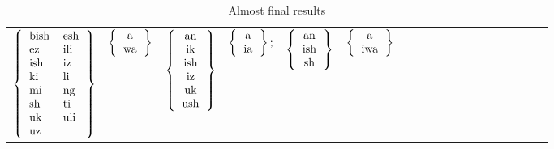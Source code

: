 \documentclass[output=paper,colorlinks,citecolor=brown,
]{langscibook}
\begin{document}
   
\begin{table}
\begin{tabular}{lllllllllllllllllll} 
$ \left\{ \begin{tabular}{ll} bish &  esh     \\ ez  &  ili \\ ish  & iz \\ki  & li\\mi & ng\\sh  &  ti\\ uk  &  uli \\ uz \end{tabular} \right\} $& $\left\{ \begin{tabular}{c}  a \\ wa \end{tabular} \right\}  $  &
$ \left\{ \begin{tabular}{c}  an     \\ ik \\ ish \\ iz \\ uk \\ush  \end{tabular} \right\} $&$ \left\{ \begin{tabular}{c}  a \\ ia \end{tabular} \right\}   ;$ &
$ \left\{ \begin{tabular}{c}  an     \\ ish \\ sh    \end{tabular} \right\} $& $\left\{ \begin{tabular}{c}  a \\ iwa \end{tabular} \right\} $   \\
\end{tabular}
\caption{Almost final results}
\label{finalsigs1}
\end{table}

\vspace{.2in}
\end{document}
